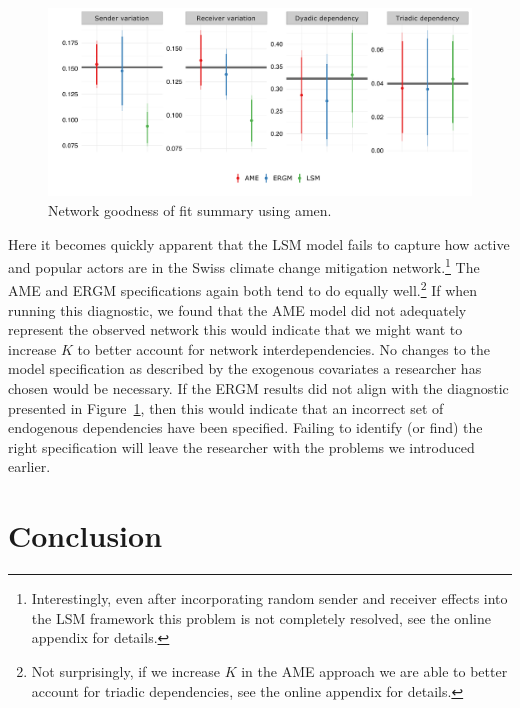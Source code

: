 \documentclass[11pt,pdflatex]{elsarticle}
\newcommand{\pkg}[1]{{\fontseries{b}\selectfont #1}}
\begin{document}
\begin{figure}[ht]
	\centering
	\includegraphics[width=1\textwidth]{netPerfCoef}
	\caption{Network goodness of fit summary using \pkg{amen}.}
	\label{fig:ergmAmePerf}
\end{figure}
\FloatBarrier

Here it becomes quickly apparent that the LSM model fails to capture how active and popular actors are in the Swiss climate change mitigation network.\footnote{Interestingly, even after incorporating random sender and receiver effects into the LSM framework this problem is not completely resolved, see the online appendix for details.} The AME and ERGM specifications again both tend to do equally well.\footnote{Not surprisingly, if we increase $K$ in the AME approach we are able to better account for triadic dependencies, see the online appendix for details.} If when running this diagnostic, we found that the AME model did not adequately represent the observed network this would indicate that we might want to increase $K$ to better account for network interdependencies. No changes to the model specification as described by the exogenous covariates a researcher has chosen would be necessary. If the ERGM results did not align with the diagnostic presented in Figure~\ref{fig:ergmAmePerf}, then this would indicate that an incorrect set of endogenous dependencies have been specified. Failing to identify (or find) the right specification will leave the researcher with the problems we introduced earlier.

\section{\textbf{Conclusion}}
\end{document}
